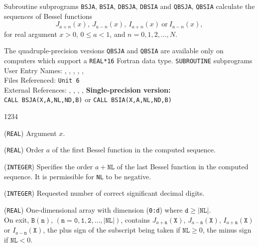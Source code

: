                              
                     
\Submitter{}                                
                         
Subroutine subprograms {\tt BSJA}, {\tt BSIA},
{\tt DBSJA}, {\tt DBSIA} and {\tt QBSJA}, {\tt QBSIA}
calculate the sequences of Bessel functions
$$ J_{a+n}(x), \ J_{a-n}(x), \ I_{a+n}(x) \
\mathrm{or} \ I_{a-n}(x),$$
for real argument $x>0$, $0\leq a<1$, and $n=0,1,2,\ldots,N$.
\par
The quadruple-precision versions {\tt QBSJA} and {\tt QBSIA}
are available only on computers which support a {\tt REAL*16}
Fortran data type.
\Structure
{\tt SUBROUTINE} subprograms\\
User Entry Names: , , , ,
\Rdef{QBSJA}, \Rdef{QBSIA} \\
Files Referenced: {\tt Unit 6} \\
External References: 
, , ,
, 
\Usage
{\bf Single-precision version:} \\[2mm]
\hspace*{8mm} {\tt CALL BSJA(X,A,NL,ND,B)} \qquad or \qquad
              {\tt CALL BSIA(X,A,NL,ND,B)}
\begin{DLtt}{1234}
\item[X] ({\tt REAL}) Argument $x$.
\item[A] ({\tt REAL}) Order $a$ of the first Bessel function in the
computed sequence.
\item[NL] ({\tt INTEGER}) Specifies the order $a+\mathtt{NL}$ of the last
Bessel function in the computed sequence.
It is permissible for {\tt NL} to be negative.
\item[ND] ({\tt INTEGER}) Requested number of correct significant
decimal digits.
\item[B] ({\tt REAL}) One-dimensional array with dimension
({\tt 0:d}) where $\mathtt{d} \geq \mathtt{|NL|}$. \\
On exit, $\mathtt{B(n)}$, $\mathtt{(n = 0,1,2,\ldots,|NL|)}$,
contains $J_{a+\mathtt{n}}(\mathtt{X})$, $J_{a-\mathtt{n}}(\mathtt{X})$,
$I_{a+\mathtt{n}}(\mathtt{X})$ or $I_{a-\mathtt{n}}(\mathtt{X})$,
the plus sign of the subscript being taken if $\mathtt{NL} \geq 0 $,
the minus sign if $\mathtt{NL} < 0$.
\end{DLtt}
